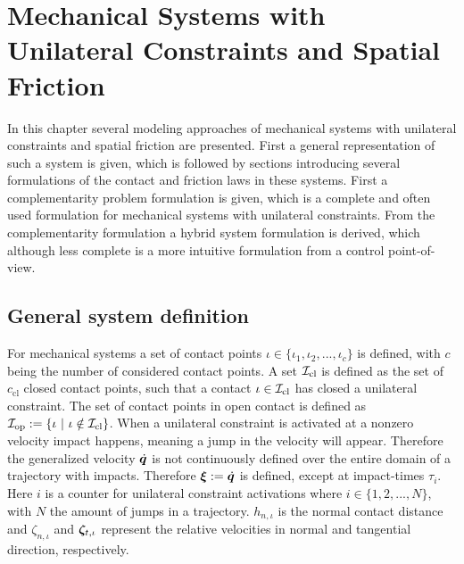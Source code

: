 \documentclass[../DC2017114Bouma.tex]{subfiles}
\begin{document}
\graphicspath{{02_Material/img/}}
\renewcommand{\chaptermark}[1]{\markboth{\thechapter.\ #1}{}}
\renewcommand{\sectionmark}[1]{\markright{#1}{}}
\pagestyle{fancyreport}
\cleartooddpage
\pagestyle{fancyreport}
\chapter{Mechanical Systems with Unilateral Constraints and Spatial Friction}\label{ch:model}
In this chapter several modeling approaches of mechanical systems with unilateral constraints and spatial friction are presented. First a general representation of such a system is given, which is followed by sections introducing several formulations of the contact and friction laws in these systems. First a complementarity problem formulation is given, which is a complete and often used formulation for mechanical systems with unilateral constraints. From the complementarity formulation a hybrid system formulation is derived, which although less complete is a more intuitive formulation from a control point-of-view.
\section{General system definition}
For mechanical systems a set of contact points $\iota\in\{\iota_1,\iota_2,...,\iota_c\}$ is defined, with $c$ being the number of considered contact points. A set $\mathcal{I}_{\text{cl}}$ is defined as the set of $c_{\text{cl}}$ closed contact points, such that a contact $\iota\in\mathcal{I}_{\text{cl}}$ has closed a unilateral constraint. The set of contact points in open contact is defined as $\Ic_{\text{op}} := \{\iota\ |\ \iota\notin\Ic_{\text{cl}}\}$. When a unilateral constraint is activated at a nonzero velocity impact happens, meaning a jump in the velocity will appear. Therefore the generalized velocity $\dot{{\boldsymbol{q}}}$ is not continuously defined over the entire domain of a trajectory with impacts. Therefore $\boldsymbol{\xi}:=\dot{{\boldsymbol{q}}}$ is defined, except at impact-times $\tau_i$. Here $i$ is a counter for unilateral constraint activations where $i\in \{1,2,...,N\}$, with $N$ the amount of jumps in a trajectory. $h_{n,\iota}$ is the normal contact distance and $\zeta_{n,\iota}$ and $\boldsymbol{\zeta}_{t,\iota}$ represent the relative velocities in normal and tangential direction,  respectively. 
\end{document}
